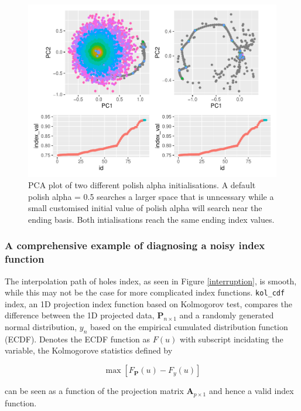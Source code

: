 \documentclass[12pt]{article}
\begin{document}
\begin{figure}
\centering
\includegraphics{paper_files/figure-latex/polish-alpha-1.pdf}
\caption{\label{polish-alpha}PCA plot of two different polish alpha
initialisations. A default polish alpha = 0.5 searches a larger space
that is unncessary while a small customised initial value of polish
alpha will search near the ending basis. Both intialisations reach the
same ending index values.}
\end{figure}

\newpage

\hypertarget{a-comprehensive-example-of-diagnosing-a-noisy-index-function}{%
\subsubsection{A comprehensive example of diagnosing a noisy index
function}\label{a-comprehensive-example-of-diagnosing-a-noisy-index-function}}

The interpolation path of holes index, as seen in Figure
\ref{interruption}, is smooth, while this may not be the case for more
complicated index functions. \texttt{kol\_cdf} index, an 1D projection
index function based on Kolmogorov test, compares the difference between
the 1D projected data, \(\mathbf{P}_{n \times 1}\) and a randomly
generated normal distribution, \(y_n\) based on the empirical cumulated
distribution function (ECDF). Denotes the ECDF function as \(F(u)\) with
subscript incidating the variable, the Kolmogorove statistics defined by

\[\max \left[F_{\mathbf{P}}(u) - F_{y}(u)\right]\]

can be seen as a function of the projection matrix
\(\mathbf{A}_{p \times 1}\) and hence a valid index function.
\end{document}
